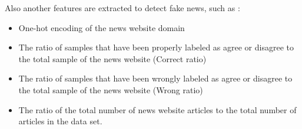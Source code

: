 \begin{itemize}
\end{itemize}


Also another features are extracted to detect fake news, such as :
\begin{itemize}
	\item One-hot encoding of the news website domain
	\item The ratio of samples that have been properly labeled as agree or disagree to the total sample of the news website (Correct ratio)
	\item The ratio of samples that have been wrongly labeled as agree or disagree to the total sample of the news website (Wrong ratio)
	\item The ratio of the total number of news website articles to the total number of articles in the data set.	
\end{itemize}



